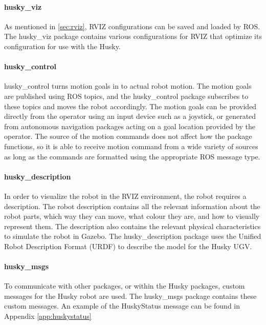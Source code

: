 \paragraph{husky\_viz}

As mentioned in \ref{sec:rviz}, RVIZ configurations can be saved and loaded by ROS. The husky\_viz package contains various configurations for RVIZ that optimize its configuration for use with the Husky.\\

\paragraph{husky\_control}

husky\_control turns motion goals in to actual robot motion. The motion goals are published using ROS topics, and the husky\_control package subscribes to these topics and moves the robot accordingly. The motion goals can be provided directly from the operator using an input device such as a joystick, or generated from autonomous navigation packages acting on a goal location provided by the operator. The source of the motion commands does not affect how the package functions, so it is able to receive motion command from a wide variety of sources as long as the commands are formatted using the appropriate ROS message type.\\ 

\paragraph{husky\_description}

In order to visualize the robot in the RVIZ environment, the robot requires a description. The robot description contains all the relevant information about the robot parts, which way they can move, what colour they are, and how to visually represent them. The description also contains the relevant physical characteristics to simulate the robot in Gazebo. The husky\_description package uses the Unified Robot Description Format (URDF) to describe the model for the Husky UGV.\\

\paragraph{husky\_msgs}

To communicate with other packages, or within the Husky packages, custom messages for the Husky robot are used. The husky\_msgs package contains these custom messages. An example of the HuskyStatus message can be found in Appendix \ref{app:huskystatus}

